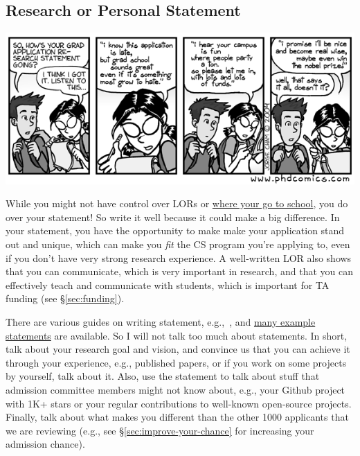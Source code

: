 \documentclass[11pt]{article}
\begin{document}
\subsection{Research or Personal Statement}\label{sec:research-statement}


    \begin{center}
      \includegraphics[scale=0.5]{c2.png}
    \end{center}

While you might not have control over LORs or \hyperref[sec:your-school]{where your go to school}, you do over your
statement! So write it well because it could make a big difference.
In your statement, you have the opportunity to make  make your application stand out and unique, which can make you \emph{fit} the CS program you're applying to, even if you don't have very strong research experience.
A well-written LOR also shows that you can communicate, which is very important in research, and that you can effectively teach and communicate with students, which is important for TA funding (see \S\ref{sec:funding}).

There are various guides on writing statement, e.g.,~\cite{blattman2022writing}, and \href{https://cs-sop.org/}{many example statements} are available. So I will not talk too much about statements. In short, talk about your research goal and vision, and convince us that you can achieve it through your experience, e.g., published papers, or if you work on some projects by yourself, talk about it. Also, use the statement to talk about stuff that admission committee members might not know about, e.g., your Github project with 1K+ stars or  your regular contributions to well-known open-source projects. Finally, talk about what makes you different than the other 1000 applicants that we are reviewing (e.g., see \S\ref{sec:improve-your-chance} for increasing your admission chance).
\end{document}
